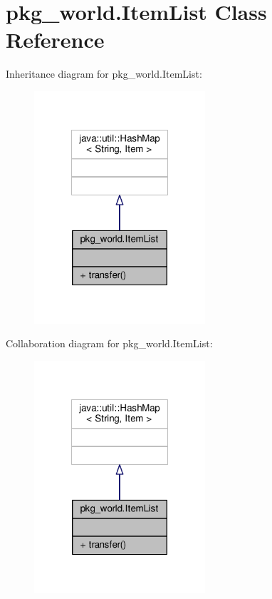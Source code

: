 \hypertarget{classpkg__world_1_1ItemList}{\section{pkg\-\_\-world.\-Item\-List Class Reference}
\label{classpkg__world_1_1ItemList}
}


Inheritance diagram for pkg\-\_\-world.\-Item\-List\-:
\nopagebreak
\begin{figure}[H]
\begin{center}
\leavevmode
\includegraphics[width=180pt]{classpkg__world_1_1ItemList__inherit__graph}
\end{center}
\end{figure}


Collaboration diagram for pkg\-\_\-world.\-Item\-List\-:
\nopagebreak
\begin{figure}[H]
\begin{center}
\leavevmode
\includegraphics[width=180pt]{classpkg__world_1_1ItemList__coll__graph}
\end{center}
\end{figure}
